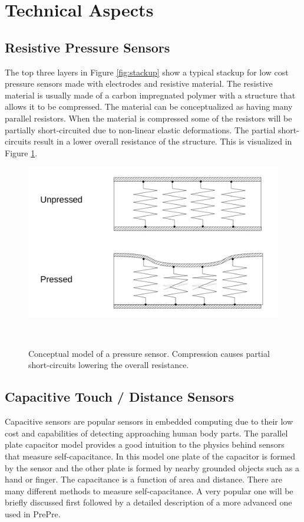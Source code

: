 \documentclass{sigchi-ext}
\begin{document}
\section{Technical Aspects}
\subsection{Resistive Pressure Sensors}
The top three layers in Figure \ref{fig:stackup} show a typical stackup for 
low cost pressure sensors made with electrodes and resistive material. The
resistive material is usually made of a carbon impregnated polymer
with a structure that allows it to be compressed. The material
can be conceptualized as having many parallel resistors. When the material is
compressed some of the resistors will be partially short-circuited due to
non-linear elastic deformations. The partial short-circuits result in a lower
overall resistance of the structure. This is visualized
in Figure \ref{fig:pressure_sensor}.

\begin{figure}[h!]
\centering
\includegraphics[trim={0 1.4cm 0 1.7cm},clip,width=0.9\columnwidth]{figures/resistive_sensor}
 \caption{Conceptual model of a pressure sensor. Compression causes
  partial short-circuits lowering the overall resistance.}~\label{fig:pressure_sensor}
\end{figure}


\subsection{Capacitive Touch / Distance Sensors}
Capacitive sensors are popular sensors in embedded computing due to their low cost and capabilities of detecting approaching human body parts. The parallel plate capacitor model provides a good intuition to the physics behind sensors that measure self-capacitance. In this model one plate of the capacitor is formed by the sensor and the other plate is formed by nearby grounded objects such as a hand or finger. The capacitance is a function of area and distance. There are many different methods to measure self-capacitance. A very popular one will be briefly discussed first followed by a detailed description of a more advanced one used in PrePre.
\end{document}
